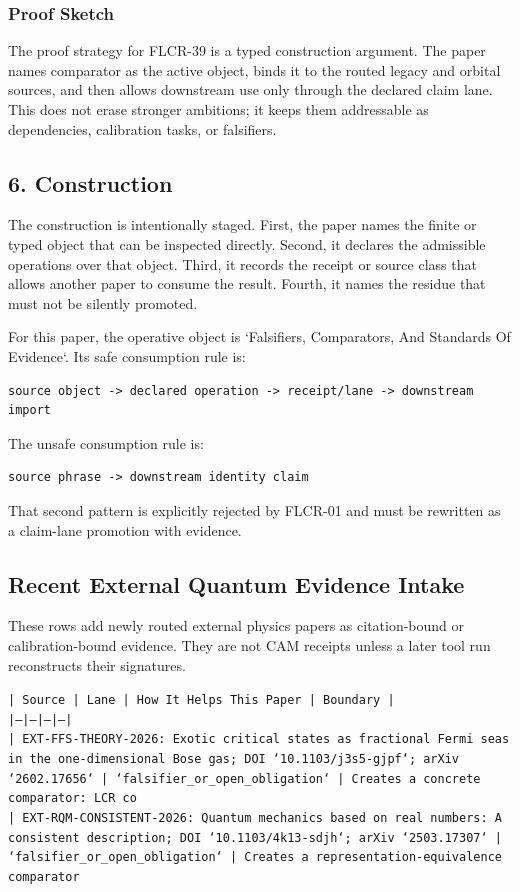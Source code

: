 \documentclass[11pt]{article}
\begin{document}
\subsubsection*{Proof Sketch}

The proof strategy for FLCR-39 is a typed construction argument. The paper names comparator as the active object, binds it to the routed legacy and orbital sources, and then allows downstream use only through the declared claim lane. This does not erase stronger ambitions; it keeps them addressable as dependencies, calibration tasks, or falsifiers.

\subsection*{6. Construction}

The construction is intentionally staged. First, the paper names the finite or
typed object that can be inspected directly. Second, it declares the admissible
operations over that object. Third, it records the receipt or source class that
allows another paper to consume the result. Fourth, it names the residue that
must not be silently promoted.

For this paper, the operative object is `Falsifiers, Comparators, And Standards Of Evidence`. Its safe consumption
rule is:

\begin{verbatim}
source object -> declared operation -> receipt/lane -> downstream import
\end{verbatim}

The unsafe consumption rule is:

\begin{verbatim}
source phrase -> downstream identity claim
\end{verbatim}

That second pattern is explicitly rejected by FLCR-01 and must be rewritten as
a claim-lane promotion with evidence.

\subsection*{Recent External Quantum Evidence Intake}

These rows add newly routed external physics papers as citation-bound or calibration-bound evidence. They are not CAM receipts unless a later tool run reconstructs their signatures.

\noindent\texttt{| Source | Lane | How It Helps This Paper | Boundary |}\\
\noindent\texttt{|---|---|---|---|}\\
\noindent\texttt{| EXT-FFS-THEORY-2026: Exotic critical states as fractional Fermi seas in the one-dimensional Bose gas; DOI `10.1103/j3s5-gjpf`; arXiv `2602.17656` | `falsifier\_or\_open\_obligation` | Creates a concrete comparator: LCR co}\\
\noindent\texttt{| EXT-RQM-CONSISTENT-2026: Quantum mechanics based on real numbers: A consistent description; DOI `10.1103/4k13-sdjh`; arXiv `2503.17307` | `falsifier\_or\_open\_obligation` | Creates a representation-equivalence comparator}\\
\end{document}
